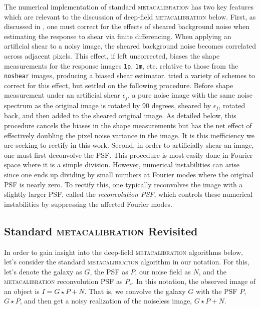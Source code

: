 \documentclass[twocolumn]{openjournal}
\makeatletter
\newcommand{\mcal}{\textsc{metacalibration}\@\xspace}
\newcommand{\noshear}{\texttt{noshear}\@\xspace}
\makeatother
\begin{document}
The numerical implementation of standard \mcal has two key features which are relevant
to the discussion of deep-field \mcal below. First, as discussed in
\citet{SheldonMcal2017}, one must correct for the effects of sheared background noise
when estimating the response to shear via finite differencing. When applying an
artificial shear to a noisy image, the sheared background noise becomes correlated
across adjacent pixels. This effect, if left uncorrected, biases the shape measurements
for the response images \texttt{1p}, \texttt{1m}, etc. relative to those from the
\noshear images, producing a biased shear estimator. \citet{SheldonMcal2017} tried a
variety of schemes to correct for this effect, but settled on the following procedure.
Before shape measurement under an artificial shear $\epsilon_j$, a pure noise image with
the same noise spectrum as the original image is rotated by 90 degrees, sheared by
$\epsilon_j$, rotated back, and then added to the sheared original image. As detailed
below, this procedure cancels the biases in the shape measurements but has the net
effect of effectively doubling the pixel noise variance in the image. It is this
inefficiency we are seeking to rectify in this work. Second, in order to artificially
shear an image, one must first deconvolve the PSF. This procedure is most easily done in
Fourier space where it is a simple division. However, numerical instabilities can arise
since one ends up dividing by small numbers at Fourier modes where the original PSF is
nearly zero. To rectify this, one typically reconvolves the image with a slightly larger
PSF, called the \textit{reconvolution PSF}, which controls these numerical instabilities
by suppressing the affected Fourier modes.


\subsection{Standard \mcal Revisited}\label{sec:mcalagain}

In order to gain insight into the deep-field \mcal algorithms below, let's consider the
standard \mcal algorithm in our notation. For this, let's denote the galaxy as $G$, the
PSF as $P$, our noise field as $N$, and the \mcal reconvolution PSF as $P_r$. In this
notation, the observed image of an object is $I = G\star P + N$. That is, we convolve
the galaxy $G$ with the PSF $P$, $G\star P$, and then get a noisy realization of the
noiseless image, $G\star P + N$.
\end{document}
